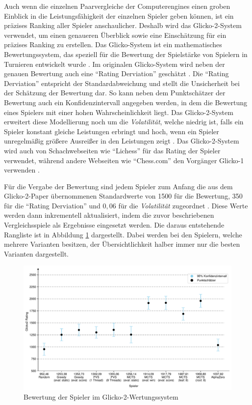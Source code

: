 Auch wenn die einzelnen Paarvergleiche der Computerengines einen groben Einblick in die Leistungsfähigkeit der einzelnen Spieler geben können, ist ein präzises Ranking aller Spieler anschaulicher. Deshalb wird das Glicko-2-System verwendet, um einen genaueren Überblick sowie eine Einschätzung für ein präzises Ranking zu erstellen. Das Glicko-System ist ein mathematisches Bewertungssystem, das speziell für die Bewertung der Spielstärke von Spielern in Turnieren entwickelt wurde \cite[S. 377]{1999.GlickoMath}. Im originalen Glicko-System wird neben der genauen Bewertung auch eine \enquote{Rating Derviation} geschätzt \cite[S. 1f.]{2016.Glicko}. Die \enquote{Rating Derviation} entspricht der Standardabweichung und stellt die Unsicherheit bei der Schätzung der Bewertung dar. So kann neben dem Punktschätzer der Bewertung auch ein Konfidenzintervall angegeben werden, in dem die Bewertung eines Spielers mit einer hohen Wahrscheinlichkeit liegt. Das Glicko-2-System erweitert diese Modellierung noch um die \emph{Volatilität}, welche niedrig ist, falls ein Spieler konstant gleiche Leistungen erbringt und hoch, wenn ein Spieler unregelmäßig größere Ausreißer in den Leistungen zeigt \cite[S. 1]{2022.Glicko2}. Das Glicko-2-System wird auch von Schachwebseiten wie \enquote{Lichess} für das Rating der Spieler verwendet, während andere Webseiten wie \enquote{Chess.com} den Vorgänger Glicko-1 verwenden \cite{2024.ChessRatingSystems}.

Für die Vergabe der Bewertung sind jedem Spieler zum Anfang die aus dem Glicko-2-Paper übernommenen Standardwerte von 1500 für die Bewertung, 350 für die \enquote{Rating Derviation} und $0{,}06$ für die \emph{Volatilität} zugeordnet \cite[S. 2]{2022.Glicko2}. Diese Werte werden dann inkrementell aktualisiert, indem die zuvor beschriebenen Vergleichsspiele als Ergebnisse eingesetzt werden. Die daraus entstehende Rangliste ist in Abbildung \ref{fig:player-ratings} dargestellt. Dabei werden bei den Spielern, welche mehrere Varianten besitzen, der Übersichtlichkeit halber immer nur die besten Varianten dargestellt.

\pagebreak

\begin{figure}[!ht]
    \centering
    \includegraphics[width=\textwidth]{res/pictures/plots/player-ratings.pdf}
    \caption{Bewertung der Spieler im Glicko-2-Wertungssystem}
    \label{fig:player-ratings}
\end{figure}

